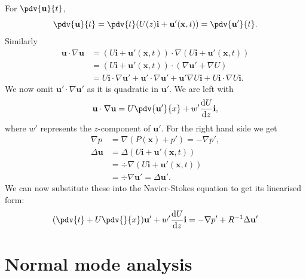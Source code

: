 For $ \pdv{\mathbf{u}}{t} $, 
\begin{equation}
    \pdv{\mathbf{u}}{t} = \pdv{t} (U(z) \mathbf{i} + \mathbf{u}'(\mathbf{x}, t)) = \pdv{\mathbf{u}'}{t}.
\end{equation}
Similarly
\begin{align}
    \mathbf{u} \cdot \nabla \mathbf{u} &= (U \mathbf{i} + \mathbf{u}' (\mathbf{x}, t)) \cdot \nabla (U \mathbf{i} + \mathbf{u}' (\mathbf{x}, t)) \nonumber\\
    &= (U \mathbf{i} + \mathbf{u}' (\mathbf{x}, t)) \cdot (\nabla \mathbf{u}' + \nabla U) \nonumber\\
    &= U \mathbf{i} \cdot \nabla \mathbf{u}' + \mathbf{u}' \cdot \nabla \mathbf{u}' + \mathbf{u}' \nabla U \mathbf{i} + U \mathbf{i} \cdot \nabla U \mathbf{i}.
\end{align}
We now omit $ \mathbf{u}' \cdot \nabla \mathbf{u}' $ as it is quadratic in $ \mathbf{u}' $. We are left with
\begin{equation}
    \mathbf{u} \cdot \nabla \mathbf{u} = U \pdv{\mathbf{u}'}{x} + w' \frac{\text{d}U}{\text{d}z} \mathbf{i},
\end{equation}
where $ w' $ represents the $ z$-component of $ \mathbf{u}'$. For the right hand side we get
\begin{align}
    \nabla p &= \nabla (P(\mathbf{x}) + p') = -\nabla p', \nonumber\\
    \Delta \mathbf{u} &= \Delta (U \mathbf{i} + \mathbf{u}' (\mathbf{x}, t)) \nonumber\\
    &= \div{\nabla (U \mathbf{i} + \mathbf{u}' (\mathbf{x}, t))} \nonumber\\
    &= \div{\nabla \mathbf{u}'} = \Delta \mathbf{u}'.
\end{align}
We can now substitute these into the Navier-Stokes equation to get its linearised form:
\begin{equation}
    (\pdv{t} + U \pdv{}{x}) \mathbf{u}' + w' \frac{\text{d}U}{\text{d}z} \mathbf{i} = - \nabla p' + R^{-1} \Delta \mathbf{u}'
\label{nslin}
\end{equation}

\section{Normal mode analysis}

